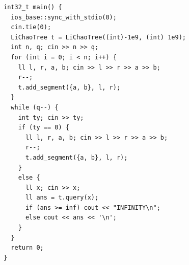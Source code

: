\begin{verbatim}
int32_t main() {
  ios_base::sync_with_stdio(0);
  cin.tie(0);
  LiChaoTree t = LiChaoTree((int)-1e9, (int) 1e9);
  int n, q; cin >> n >> q;
  for (int i = 0; i < n; i++) {
    ll l, r, a, b; cin >> l >> r >> a >> b;
    r--;
    t.add_segment({a, b}, l, r);
  }
  while (q--) {
    int ty; cin >> ty;
    if (ty == 0) {
      ll l, r, a, b; cin >> l >> r >> a >> b;
      r--;
      t.add_segment({a, b}, l, r);
    }
    else {
      ll x; cin >> x;
      ll ans = t.query(x);
      if (ans >= inf) cout << "INFINITY\n";
      else cout << ans << '\n';
    }
  }
  return 0;
}
\end{verbatim}
\fi %